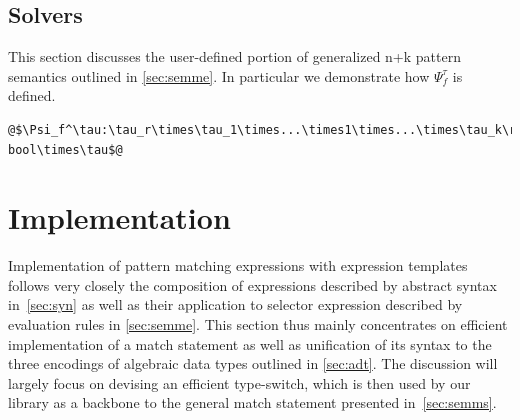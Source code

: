 \documentclass[preprint]{sigplanconf}
\begin{document}




\subsection{Solvers}
\label{sec:slv}

This section discusses the user-defined portion of generalized n+k pattern 
semantics outlined in \textsection\ref{sec:semme}. In particular we demonstrate 
how $\Psi_f^\tau$ is defined.

\begin{lstlisting}
@$\Psi_f^\tau:\tau_r\times\tau_1\times...\times1\times...\times\tau_k\rightarrow bool\times\tau$@
\end{lstlisting} 

\section{Implementation} %
\label{sec:impl}

Implementation of pattern matching expressions with expression templates follows 
very closely the composition of expressions described by abstract syntax 
in~\textsection\ref{sec:syn} as well as their application to selector expression 
described by evaluation rules in \textsection\ref{sec:semme}. This section thus
mainly concentrates on efficient implementation of a match statement as well as 
unification of its syntax to the three encodings of algebraic data types 
outlined in \textsection\ref{sec:adt}. The discussion will largely focus on 
devising an efficient type-switch, which is then used by our library as a 
backbone to the general match statement presented in~\textsection\ref{sec:semms}. 
\end{document}
